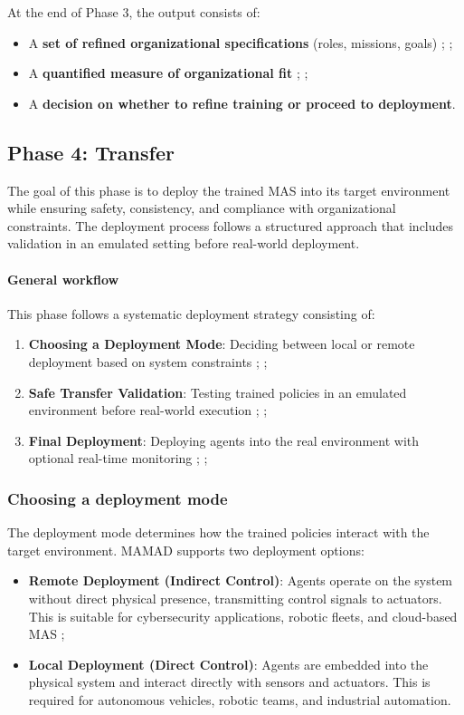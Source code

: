 \documentclass[pdflatex,sn-mathphys-num]{sn-jnl}%
\theoremstyle{thmstyleone}%
\theoremstyle{thmstyletwo}%
\theoremstyle{thmstylethree}%
\begin{document}
At the end of Phase 3, the output consists of:
\begin{itemize}
    \item A \textbf{set of refined organizational specifications} (roles, missions, goals) ; ;
    \item A \textbf{quantified measure of organizational fit} ; ;
    \item A \textbf{decision on whether to refine training or proceed to deployment}.
\end{itemize}



\subsection{Phase 4: Transfer}

The goal of this phase is to deploy the trained MAS into its target environment while ensuring safety, consistency, and compliance with organizational constraints. The deployment process follows a structured approach that includes validation in an emulated setting before real-world deployment.

\paragraph{\textbf{General workflow}}
This phase follows a systematic deployment strategy consisting of:
\begin{enumerate}
    \item \textbf{Choosing a Deployment Mode}: Deciding between local or remote deployment based on system constraints ; ;
    \item \textbf{Safe Transfer Validation}: Testing trained policies in an emulated environment before real-world execution ; ;
    \item \textbf{Final Deployment}: Deploying agents into the real environment with optional real-time monitoring ; ;
\end{enumerate}

\subsubsection{Choosing a deployment mode}
The deployment mode determines how the trained policies interact with the target environment. MAMAD supports two deployment options:

\begin{itemize}
    \item \textbf{Remote Deployment (Indirect Control)}: Agents operate on the system without direct physical presence, transmitting control signals to actuators. This is suitable for cybersecurity applications, robotic fleets, and cloud-based MAS ;
    \item \textbf{Local Deployment (Direct Control)}: Agents are embedded into the physical system and interact directly with sensors and actuators. This is required for autonomous vehicles, robotic teams, and industrial automation.
\end{itemize}
\end{document}
